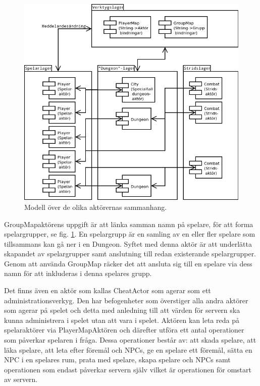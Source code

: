 \documentclass[a4paper]{article}
\begin{document}
\begin{figure}[hbt]
\centering
\includegraphics[width=1.0\textwidth]{serverActorModel2-2}
\caption{\label{fig:ServerActorModel}Modell över de olika aktörernas sammanhang.}
\end{figure}

GroupMapaktörens uppgift är att länka samman namn på spelare, för att forma spelargrupper, se fig. \ref{fig:ServerActorModel}. En spelargrupp är en samling av en eller fler spelare som tillsammans kan gå ner i en Dungeon. Syftet med denna aktör är att underlätta skapandet av spelargrupper samt anslutning till redan existerande spelargrupper. Genom att använda GroupMap räcker det att ansluta sig till en spelare via dess namn för att inkluderas i denna spelares grupp.

Det finns även en aktör som kallas CheatActor som agerar som ett administrationsverkyg. Den har befogenheter som överstiger alla andra aktörer som agerar på spelet och detta med anledning till att värden för servern ska kunna administrera i spelet utan att vara i spelet. Aktören kan leta reda på spelaraktörer via PlayerMapAktören och därefter utföra ett antal operationer som påverkar spelaren i fråga. Dessa operationer består av: att skada spelare, att läka spelare, att leta efter föremål och NPCs, ge en spelare ett föremål, sätta en NPC i en spelares rum, prata med spelare, skapa spelare och NPCs samt operationen som endast påverkar servern själv vilket är operationen för omstart av servern. 
\end{document}
